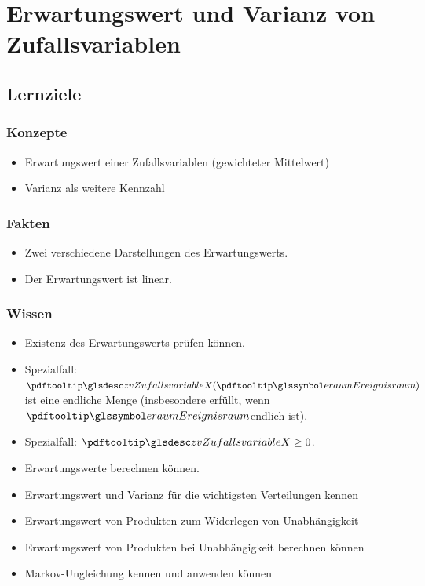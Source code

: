 


\chapter{Erwartungswert und Varianz von Zufallsvariablen}\label{ch:erwartungswert-und-varianz-von-zufallsvariablen}


\section*{Lernziele}

\subsection*{Konzepte}
\begin{itemize}
    \item Erwartungswert einer Zufallsvariablen (gewichteter Mittelwert)
    \item Varianz als weitere Kennzahl
\end{itemize}

\subsection*{Fakten}
\begin{itemize}
    \item Zwei verschiedene Darstellungen des Erwartungswerts.
    \item Der Erwartungswert ist linear.
\end{itemize}

\subsection*{Wissen}
\begin{itemize}
    \item Existenz des Erwartungswerts prüfen können.
    \item Spezialfall: \(\zvx (\eraum)\)ist eine endliche Menge (insbesondere erfüllt, wenn \(\eraum\)endlich ist).
    \item Spezialfall: \(\zvx  \geq 0\).
    \item Erwartungswerte berechnen können.
    \item Erwartungswert und Varianz für die wichtigsten Verteilungen kennen
    \item Erwartungswert von Produkten zum Widerlegen von Unabhängigkeit
    \item Erwartungswert von Produkten bei Unabhängigkeit berechnen können
    \item Markov-Ungleichung kennen und anwenden können
\end{itemize}

